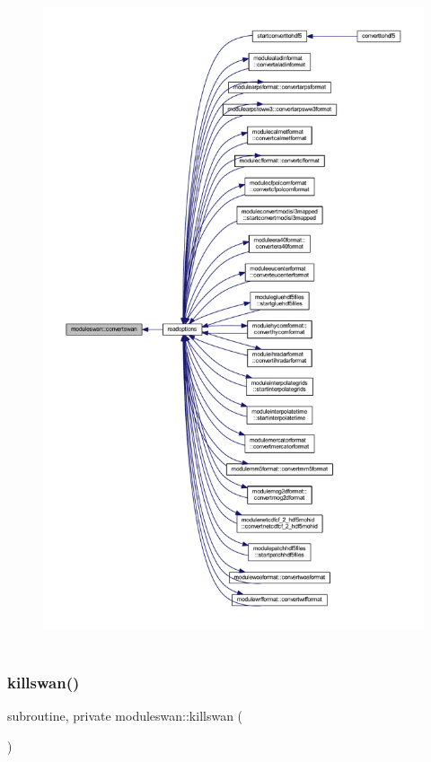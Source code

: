 \begin{figure}[H]
\begin{center}
\leavevmode
\includegraphics[height=550pt]{namespacemoduleswan_aa4916273cc3ac0c249fd48ef574161b3_icgraph}
\end{center}
\end{figure}
\mbox{\label{namespacemoduleswan_a649aac26c71119742c249a918e913f5e}} 
\subsubsection{\texorpdfstring{killswan()}{killswan()}}
{\footnotesize\ttfamily subroutine, private moduleswan\+::killswan (\begin{DoxyParamCaption}{ }\end{DoxyParamCaption})\hspace{0.3cm}{\ttfamily [private]}}

